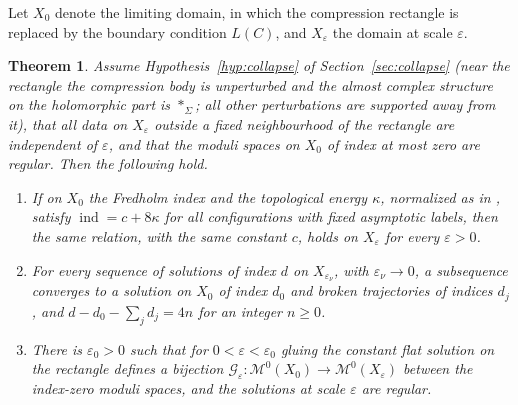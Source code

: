 \documentclass[11pt]{amsart}
\theoremstyle{definition}
\theoremstyle{remark}
\theoremstyle{plain}
\newtheorem{thmletter}{Theorem}
\numberwithin{equation}{section}
\newcommand{\cG}{\mathcal{G}}
\newcommand{\cM}{\mathcal{M}}
\newcommand{\ind}{\operatorname{ind}}
\newcommand{\eps}{\varepsilon}
\begin{document}
Let $X_0$ denote the limiting domain, in which the compression rectangle is
replaced by the boundary condition $L(C)$, and $X_\eps$ the domain at scale $\eps$.

\begin{thmletter}\label{thm:B}
Assume Hypothesis~\ref{hyp:collapse} of Section~\ref{sec:collapse} (near the rectangle the
compression body is unperturbed and the almost complex structure on the holomorphic part is
$*_\Sigma$; all
other perturbations are supported away from it), that all data on $X_\eps$ outside a fixed neighbourhood of the rectangle
are independent of $\eps$, and that the moduli spaces on $X_0$ of index at most
zero are regular. Then the following hold.
\begin{enumerate}[label=(\roman*)]
\item If on $X_0$ the Fredholm index and the topological energy $\kappa$, normalized as in \cite[Proposition~3.20]{DFL}, satisfy $\ind=c+8\kappa$ for all configurations with fixed asymptotic labels, then the same relation, with the same constant $c$, holds on $X_\eps$ for every $\eps>0$.
\item For every sequence of solutions of index $d$ on $X_{\eps_\nu}$, with
  $\eps_\nu\to0$, a subsequence converges to a solution on $X_0$ of index $d_0$
  and broken trajectories of indices $d_j$, and $d-d_0-\sum_jd_j=4n$ for an
  integer $n\ge0$.
\item There is $\eps_0>0$ such that for $0<\eps<\eps_0$ gluing the constant flat
  solution on the rectangle defines a bijection
  $\cG_\eps\colon\cM^0(X_0)\to\cM^0(X_\eps)$ between the index-zero moduli spaces,
  and the solutions at scale $\eps$ are regular.
\end{enumerate}
\end{thmletter}
\end{document}
